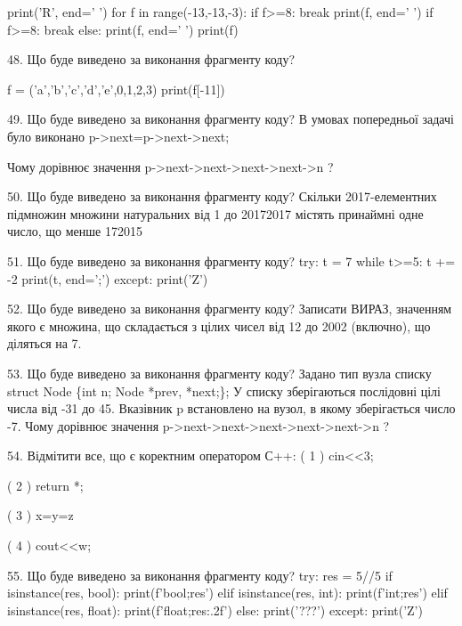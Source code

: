 \documentclass[11pt]{article}
\begin{document}
print('R', end=' ')
for f in range(-13,-13,-3):
    if f>=8:
        break
        print(f, end=' ')
    if f>=8:
        break
    else:
        print(f, end=' ')
    print(f)


48. Що буде виведено за виконання фрагменту коду?

f = ('a','b','c','d','e',0,1,2,3)
print(f[-11])



49. Що буде виведено за виконання фрагменту коду?
В умовах попередньої задачі було виконано p->next=p->next->next;

Чому дорівнює значення p->next->next->next->next->n ?

50. Що буде виведено за виконання фрагменту коду?
Скільки 2017-елементних підмножин множини натуральних від 1 до 20172017 містять принаймні одне число, що менше 172015

51. Що буде виведено за виконання фрагменту коду?
try:
    t = 7
    while t>=5:
        t += -2
    print(t, end=';')
except:
    print('Z')


52. Що буде виведено за виконання фрагменту коду?
Записати ВИРАЗ, значенням якого є множина, що складається з цілих чисел від 12 до 2002 (включно), що діляться на 7.

53. Що буде виведено за виконання фрагменту коду?
Задано тип вузла списку
struct Node \{int n; Node *prev, *next;\};
У списку зберігаються послідовні цілі числа від -31 до 45. Вказівник p встановлено на вузол, в якому зберігається число -7.
Чому дорівнює значення p->next->next->next->next->next->n ?

54. %
Відмітити все, що є коректним оператором С++:
( 1 ) cin<<3;

( 2 ) return *;

( 3 ) x=y=z

( 4 ) cout<<w;


55. Що буде виведено за виконання фрагменту коду?
try:
    res = 5//5%
    if isinstance(res, bool):
        print(f'bool;{res}')
    elif isinstance(res, int):
        print(f'int;{res}')
    elif isinstance(res, float):
        print(f'float;{res:.2f}')
    else:
        print('???')
except:
    print('Z')

\end{document}
